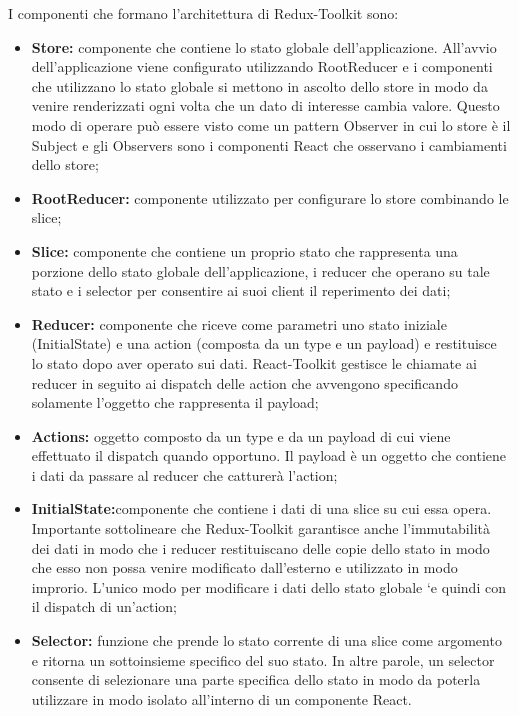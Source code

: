 I componenti che formano l’architettura di Redux-Toolkit sono:
\begin{itemize}
    \item \textbf{Store:} componente che contiene lo stato globale dell’applicazione.
    All’avvio dell’applicazione viene configurato utilizzando RootReducer e i componenti che utilizzano
    lo stato globale si mettono in ascolto dello store in modo da venire renderizzati ogni volta che un dato
    di interesse cambia valore. Questo modo di operare può essere visto come un pattern Observer in
    cui lo store è il Subject e gli Observers sono i componenti React che osservano i cambiamenti dello store;
    \item \textbf{RootReducer:} componente utilizzato per configurare lo store combinando le slice;
    \item \textbf{Slice:} componente che contiene un proprio stato che rappresenta una porzione dello stato globale
    dell’applicazione, i reducer che operano su tale stato e i selector per consentire ai suoi client il
    reperimento dei dati;
    \item \textbf{Reducer:} componente che riceve come parametri uno stato iniziale (InitialState) e una action
    (composta da un type e un payload) e restituisce lo stato dopo aver operato sui dati. 
    React-Toolkit gestisce le chiamate ai reducer in seguito ai dispatch delle action che avvengono
    specificando solamente l’oggetto che rappresenta il payload;
    \item \textbf{Actions:} oggetto composto da un type e da un payload di cui viene effettuato il dispatch quando
    opportuno. Il payload è un oggetto che contiene i dati da passare al reducer che catturerà l’action;
    \item \textbf{InitialState:}componente che contiene i dati di una slice su cui essa opera.
    Importante sottolineare che Redux-Toolkit garantisce anche l’immutabilità
    dei dati in modo che i reducer restituiscano delle copie dello stato in modo che esso non possa venire
    modificato dall’esterno e utilizzato in modo improrio.
    L’unico modo per modificare i dati dello stato globale `e quindi con il dispatch di un’action;
    \item \textbf{Selector:} funzione che prende lo stato corrente di una slice come argomento e ritorna un sottoinsieme
    specifico del suo stato. In altre parole, un selector consente di selezionare una parte specifica
    dello stato in modo da poterla utilizzare in modo isolato all’interno di un componente React.
\end{itemize}

